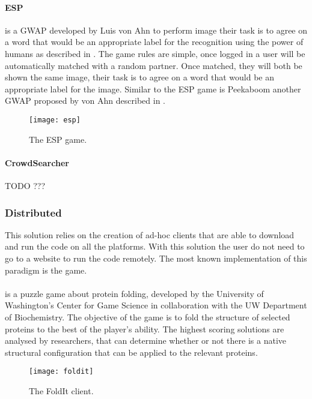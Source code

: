 \paragraph{ESP} is a \ac{GWAP} developed by Luis von Ahn to perform image
their task is to agree on a word that would be an appropriate label for the
recognition using the power of humans as described in \cite{von2004labeling}.
The game rules are simple, once logged in a user will be automatically matched
with a random partner. Once matched, they will both be shown the same image,
their task is to agree on a word that would be an appropriate label for the
image. Similar to the ESP game is Peekaboom another \ac{GWAP} proposed by von
Ahn described in \cite{von2006peekaboom}.
\begin{figure}[htb]
    \centering
    \texttt{[image: esp]}
    \caption{The ESP game.}
    \label{fig:esp}
\end{figure}


\paragraph{CrowdSearcher}\label{sec:bg:crowdsearch}
TODO ???






\subsubsection{Distributed}
This solution relies on the creation of ad-hoc clients that are able to download
and run the code on all the platforms. With this solution the user do not need
to go to a website to run the code remotely. The most known implementation of
this paradigm is the  game.\\

\paragraph{} is a puzzle game about protein folding, developed
by the University of Washington's Center for Game Science in collaboration with
the UW Department of Biochemistry. The objective of the game is to fold the
structure of selected proteins to the best of the player's ability. The highest
scoring solutions are analysed by researchers, that can determine whether or not
there is a native structural configuration that can be applied to the relevant
proteins.
\begin{figure}[htb]
    \centering
    \texttt{[image: foldit]}
    \caption{The FoldIt client.}
    \label{fig:foldit}
\end{figure}